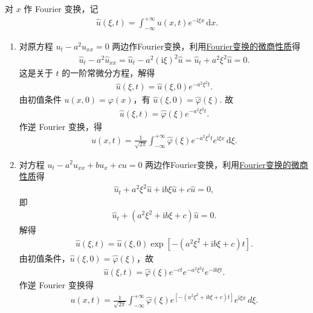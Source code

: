 \documentclass[../../main.tex]{subfiles}%
\begin{document}
\begin{solution}
对 $x$ 作 Fourier 变换，记
\begin{align*}
\hat u(\xi,t)=\int_{-\infty}^{+\infty}u(x,t)e^{-\mathrm{i}\xi  x}\,\mathrm{d}x.
\end{align*}
\begin{enumerate}[(1)]
\item 对原方程 $u_t-a^2u_{xx}=0$ 两边作Fourier变换，利用\hyperref[proposition:Fourier 变换的基本性质1-2]{Fourier变换的微商性质}得
\begin{align*}
\hat{u}_t-a^2\hat{u}_{xx}=\hat{u}_t-a^2(\mathrm{i}\xi )^2\hat{u}=\hat{u}_t+a^2\xi ^2\hat{u}=0.
\end{align*}
这是关于 $t$ 的一阶常微分方程，解得
\begin{align*}
\hat u(\xi,t)=\hat u(\xi,0)e^{-a^2\xi^2t}.
\end{align*}
由初值条件 $u(x,0)=\varphi(x)$，有 $\hat u(\xi,0)=\hat\varphi(\xi)$. 故
\begin{align*}
\hat u(\xi,t)=\hat\varphi(\xi)e^{-a^2\xi^2t}.
\end{align*}
作逆 Fourier 变换，得
\begin{align*}
u(x,t)=\frac{1}{\sqrt{2\pi}}\int_{-\infty}^{+\infty}\hat\varphi(\xi)e^{-a^2\xi^2t}e^{\mathrm{i}\xi  x}\,\mathrm{d}\xi.
\end{align*}

\item 对方程 $u_t-a^2u_{xx}+bu_x+cu=0$ 两边作Fourier变换，利用\hyperref[proposition:Fourier 变换的基本性质1-2]{Fourier变换的微商性质}得
\begin{align*}
\hat u_t+a^2\xi^2\hat u+\mathrm{i}b\xi\hat u+c\hat u=0,
\end{align*}
即
\begin{align*}
\hat u_t+(a^2\xi^2+\mathrm{i}b\xi+c)\hat u=0.
\end{align*}
解得
\begin{align*}
\hat u(\xi,t)=\hat u(\xi,0)\exp\left[-(a^2\xi^2+\mathrm{i}b\xi+c)t\right].
\end{align*}
由初值条件，$\hat u(\xi,0)=\hat\varphi(\xi)$，故
\begin{align*}
\hat u(\xi,t)=\hat\varphi(\xi)e^{-ct}e^{-a^2\xi^2t}e^{-\mathrm{i}b\xi t}.
\end{align*}
作逆 Fourier 变换得
\begin{align*}
u(x,t)=\frac{1}{\sqrt{2\pi}}\int_{-\infty}^{+\infty}\hat\varphi(\xi)e^{\left[-(a^2\xi^2+\mathrm{i}b\xi+c)t\right]}e^{\mathrm{i}\xi x}\,d\xi.
\end{align*}


\end{enumerate}
\end{solution}
\end{document}
